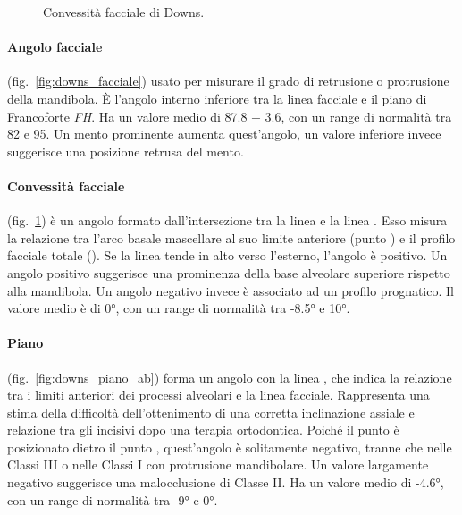 \begin{figure}[h!]
\begin{minipage}{.44\textwidth}
 \caption{Convessità facciale di Downs.}
 \label{fig:downs_convessita}
\end{minipage}
\end{figure}

\paragraph{Angolo facciale} (fig.~\ref{fig:downs_facciale}) usato per misurare il grado di retrusione o protrusione della mandibola. È l'angolo interno inferiore tra la linea facciale  e il piano di Francoforte \textit{FH}. Ha un valore medio di 87.8 $\pm$ 3.6, con un range di normalità tra 82 e 95. Un mento prominente aumenta quest'angolo, un valore inferiore invece suggerisce una posizione retrusa del mento.

\paragraph{Convessità facciale} (fig.~\ref{fig:downs_convessita}) è un angolo formato dall'intersezione tra la linea  e la linea . Esso misura la relazione tra l'arco basale mascellare al suo limite anteriore (punto ) e il profilo facciale totale (). Se la linea  tende in alto verso l'esterno, l'angolo è positivo. Un angolo positivo suggerisce una prominenza della base alveolare superiore rispetto alla mandibola. Un angolo negativo invece è associato ad un profilo prognatico. Il valore medio è di 0°, con un range di normalità tra -8.5° e 10°.

\paragraph{Piano } (fig.~\vref{fig:downs_piano_ab}) forma un angolo con la linea , che indica la relazione tra i limiti anteriori dei processi alveolari e la linea facciale. Rappresenta una stima della difficoltà dell'ottenimento di una corretta inclinazione assiale e relazione tra gli incisivi dopo una terapia ortodontica. Poiché il punto  è posizionato dietro il punto , quest'angolo è solitamente negativo, tranne che nelle Classi III o nelle Classi I con protrusione mandibolare. Un valore largamente negativo suggerisce una malocclusione di Classe II. Ha un valore medio di -4.6°, con un range di normalità tra -9° e 0°.

